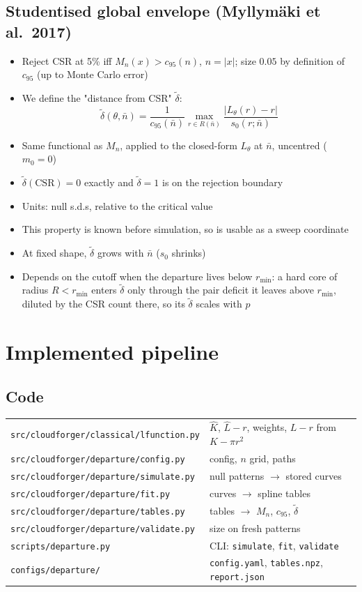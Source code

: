 \documentclass[11pt]{article}
\newcommand{\dt}{\tilde\delta}
\newcommand{\nb}{\bar n}
\begin{document}
\subsection*{Studentised global envelope (Myllym\"aki et al.\ 2017)}
\begin{itemize}
  \item Reject CSR at 5\% iff $M_n(x) > c_{95}(n)$, $n = |x|$; size $0.05$ by definition of $c_{95}$ (up to Monte Carlo error)
  \item We define the "distance from CSR" $\dt$:
    \[
      \dt(\theta,\nb) = \frac{1}{c_{95}(\nb)} \max_{r\in R(\nb)} \frac{|L_\theta(r) - r|}{s_0(r;\nb)}
    \]
  \item Same functional as $M_n$, applied to the closed-form $L_\theta$ at $\nb$, uncentred ($m_0 = 0$)
  \item $\dt(\text{CSR}) = 0$ exactly and $\dt = 1$ is on the rejection boundary
  \item Units: null s.d.s, relative to the critical value
  \item This property is known before simulation, so is usable as a sweep coordinate
  \item At fixed shape, $\dt$ grows with $\nb$ ($s_0$ shrinks)
  \item Depends on the cutoff when the departure lives below $r_{\min}$: a hard core of radius $R<r_{\min}$ enters $\dt$ only through the pair deficit it leaves above $r_{\min}$, diluted by the CSR count there, so its $\dt$ scales with $p$
\end{itemize}

\section{Implemented pipeline}

\subsection*{Code}
\begin{tabular}{@{}ll@{}}
\toprule
\texttt{src/cloudforger/classical/lfunction.py} & $\hat K$, $\hat L - r$, weights, $L-r$ from $K - \pi r^2$ \\
\texttt{src/cloudforger/departure/config.py}   & config, $n$ grid, paths \\
\texttt{src/cloudforger/departure/simulate.py} & null patterns $\to$ stored curves \\
\texttt{src/cloudforger/departure/fit.py}      & curves $\to$ spline tables \\
\texttt{src/cloudforger/departure/tables.py}   & tables $\to$ $M_n$, $c_{95}$, $\dt$ \\
\texttt{src/cloudforger/departure/validate.py} & size on fresh patterns \\
\texttt{scripts/departure.py}                  & CLI: \texttt{simulate}, \texttt{fit}, \texttt{validate} \\
\texttt{configs/departure/}                    & \texttt{config.yaml}, \texttt{tables.npz}, \texttt{report.json} \\
\bottomrule
\end{tabular}
\end{document}

